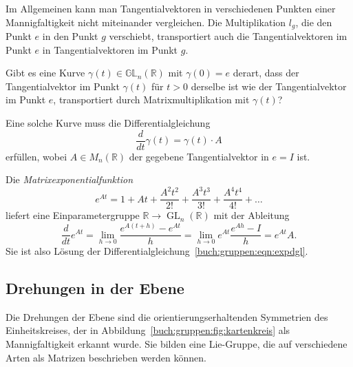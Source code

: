 Im Allgemeinen kann man Tangentialvektoren in verschiedenen Punkten
einer Mannigfaltigkeit nicht miteinander vergleichen.
Die Multiplikation $l_g$, die den Punkt $e$ in den Punkt $g$ verschiebt,
transportiert auch die Tangentialvektoren im Punkt $e$ in 
Tangentialvektoren im Punkt $g$.

\begin{aufgabe}
Gibt es eine Kurve $\gamma(t)\in\mathbb{GL}_n(\mathbb{R})$ mit
$\gamma(0)=e$ derart, dass der Tangentialvektor im Punkt $\gamma(t)$
für $t>0$ derselbe ist wie der Tangentialvektor im Punkt $e$, transportiert
durch Matrixmultiplikation mit $\gamma(t)$?
\end{aufgabe}

Eine solche Kurve muss die Differentialgleichung
\begin{equation}
\frac{d}{dt}\gamma(t)
=
\gamma(t)\cdot A
\label{buch:gruppen:eqn:expdgl}
\end{equation}
erfüllen, wobei $A\in M_n(\mathbb{R})$ der gegebene Tangentialvektor
in $e=I$ ist.

Die {\em Matrixexponentialfunktion}
%
\[
e^{At}
=
1+At+\frac{A^2t^2}{2!}+\frac{A^3t^3}{3!}+\frac{A^4t^4}{4!}+\dots
\]
liefert eine Einparametergruppe
$\mathbb{R}\to \operatorname{GL}_n(\mathbb{R})$ mit der Ableitung
\[
\frac{d}{dt} e^{At}
=
\lim_{h\to 0} \frac{e^{A(t+h)}-e^{At}}{h}
=
\lim_{h\to 0} e^{At}\frac{e^{Ah}-I}{h}
=
e^{At} A.
\]
Sie ist also Lösung der Differentialgleichung~\eqref{buch:gruppen:eqn:expdgl}.

\subsection{Drehungen in der Ebene
\label{buch:gruppen:drehungen2d}}
Die Drehungen der Ebene sind die orientierungserhaltenden Symmetrien
des Einheitskreises, der in Abbildung~\ref{buch:gruppen:fig:kartenkreis}
als Mannigfaltigkeit erkannt wurde.
Sie bilden eine Lie-Gruppe, die auf verschiedene Arten als Matrizen
beschrieben werden können.

